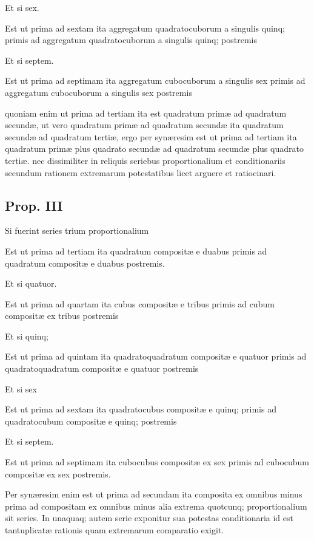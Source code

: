 \documentclass[11pt,a4paper]{article}
\begin{document}
Et si sex.

Est ut prima ad sextam ita aggregatum quadratocuborum a singulis quinq; primis ad aggregatum quadratocuborum a singulis quinq; postremis

Et si septem.

Est ut prima ad septimam ita aggregatum cubocuborum a singulis sex primis ad aggregatum cubocuborum a singulis sex postremis

quoniam enim ut prima ad tertiam ita est quadratum primæ ad quadratum secundæ, ut vero quadratum primæ ad quadratum secundæ ita quadratum secundæ ad quadratum tertiæ, ergo per synæresim est ut prima ad tertiam ita quadratum primæ plus quadrato secundæ ad quadratum secundæ plus quadrato tertiæ. nec dissimiliter in reliquis seriebus proportionalium et conditionariis secundum rationem extremarum potestatibus licet arguere et ratiocinari.

\subsection*{Prop. III}

Si fuerint series trium proportionalium

Est ut prima ad tertiam ita quadratum compositæ e duabus primis ad quadratum compositæ e duabus postremis.

Et si quatuor.

Est ut prima ad quartam ita cubus compositæ e tribus primis ad cubum compositæ ex tribus postremis

Et si quinq;

Est ut prima ad quintam ita quadratoquadratum compositæ e quatuor primis ad quadratoquadratum compositæ e quatuor postremis

Et si sex

Est ut prima ad sextam ita quadratocubus compositæ e quinq; primis ad quadratocubum compositæ e quinq; postremis

Et si septem.

Est ut prima ad septimam ita cubocubus compositæ ex sex primis ad cubocubum compositæ ex sex postremis.

Per synæresim enim est ut prima ad secundam ita composita ex omnibus minus prima ad compositam ex omnibus minus alia extrema quotcunq; proportionalium sit series. In unaquaq; autem serie exponitur sua potestas conditionaria id est tantuplicatæ rationis quam extremarum comparatio exigit.
\end{document}
